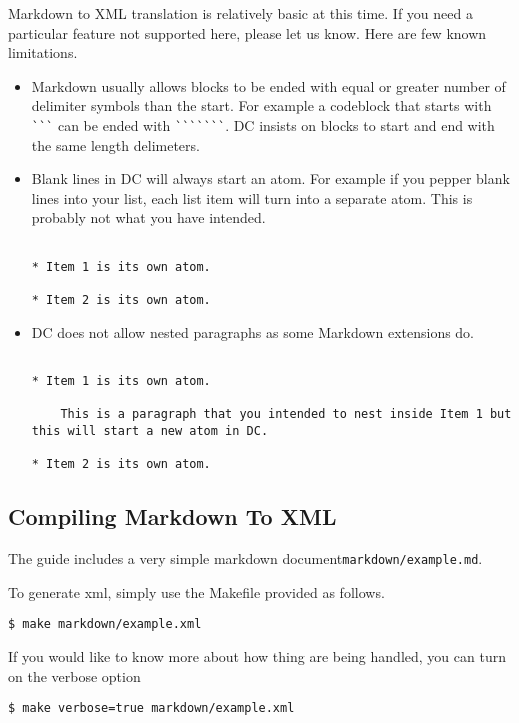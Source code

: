Markdown to XML translation is relatively basic at this time.  If you need a particular feature not supported here, please let us know.
%
Here are few known limitations.
\begin{itemize}
\item Markdown usually allows blocks to be ended with equal or greater number of delimiter symbols than the start. For example a codeblock that starts with \lstinline!```! can be ended with \lstinline!```````!.  DC insists on blocks to start and end with the same length delimeters.

\item Blank lines in DC will always start an atom.  For example if you pepper blank lines into your list, each list item will turn into a separate atom.  This is probably not what you have intended.  
\begin{lstlisting}

* Item 1 is its own atom.

* Item 2 is its own atom.

\end{lstlisting}

\item DC does not allow nested paragraphs as some Markdown extensions do.  

\begin{lstlisting}

* Item 1 is its own atom.

    This is a paragraph that you intended to nest inside Item 1 but  this will start a new atom in DC.  

* Item 2 is its own atom.

\end{lstlisting}

\end{itemize}


\subsection{Compiling Markdown To XML}

The guide includes a very simple markdown document\lstinline`markdown/example.md`.

\begin{gram}
To generate xml, simply use the Makefile provided as follows.
%
\begin{lstlisting}
$ make markdown/example.xml
\end{lstlisting}
%
If you would like to know more about how thing are being handled, you can turn on the verbose option
%
\begin{lstlisting}
$ make verbose=true markdown/example.xml 
\end{lstlisting}
\end{gram}

